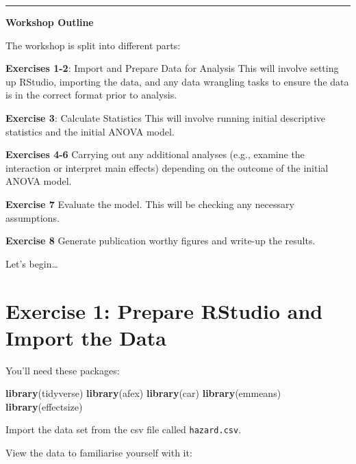 \documentclass[
]{book}
\newenvironment{Shaded}{\begin{snugshade}}{\end{snugshade}}
\newcommand{\FunctionTok}[1]{\textcolor[rgb]{0.13,0.29,0.53}{\textbf{#1}}}
\newcommand{\NormalTok}[1]{#1}
\let\oldsection\section
\renewcommand{\section}{\needspace{5\baselineskip}\oldsection}
\begin{document}
\begin{center}\rule{0.5\linewidth}{0.5pt}\end{center}

\textbf{Workshop Outline}

The workshop is split into different parts:

\textbf{Exercises 1-2}: Import and Prepare Data for Analysis This will involve setting up RStudio, importing the data, and any data wrangling tasks to ensure the data is in the correct format prior to analysis.

\textbf{Exercise 3}: Calculate Statistics This will involve running initial descriptive statistics and the initial ANOVA model.

\textbf{Exercises 4-6} Carrying out any additional analyses (e.g., examine the interaction or interpret main effects) depending on the outcome of the initial ANOVA model.

\textbf{Exercise 7} Evaluate the model. This will be checking any necessary assumptions.

\textbf{Exercise 8} Generate publication worthy figures and write-up the results.

Let's begin\ldots{}

\section{Exercise 1: Prepare RStudio and Import the Data}\label{exercise-1-prepare-rstudio-and-import-the-data}

You'll need these packages:

\begin{Shaded}
\begin{Highlighting}[]
\FunctionTok{library}\NormalTok{(tidyverse)}
\FunctionTok{library}\NormalTok{(afex)}
\FunctionTok{library}\NormalTok{(car)}
\FunctionTok{library}\NormalTok{(emmeans)}
\FunctionTok{library}\NormalTok{(effectsize)}
\end{Highlighting}
\end{Shaded}

Import the data set from the csv file called \texttt{hazard.csv}.

View the data to familiarise yourself with it:
\end{document}
